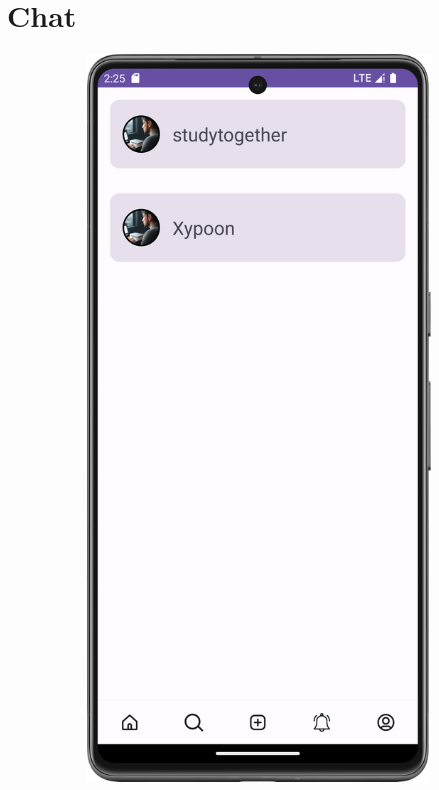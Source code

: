 \section{Chat}

\begin{figure}[H]
  \begin{subfigure}[b]{0.5\textwidth}
    \includegraphics[width=\textwidth]{Figures/Product_Images/Chat/chat_list.png}

\end{subfigure}
\end{figure}
